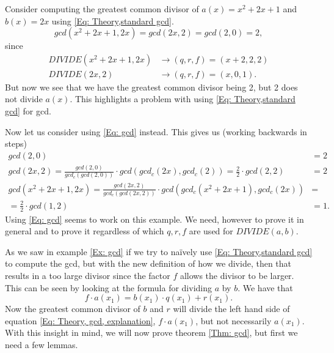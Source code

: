 \begin{example}\label{Ex: gcd}
  Consider computing the greatest common divisor of $a(x)=x^2+2x+1$ and $b(x)=2x$ using \ref{Eq: Theory,standard gcd}.
  \begin{equation}
    gcd(x^2+2x+1,2x)=gcd(2x,2)=gcd(2,0)=2,
  \end{equation}
  since
  \begin{equation}
    \begin{split}
      DIVIDE(x^2+2x+1,2x) & \rightarrow (q,r,f)=(x+2,2,2) \\
      DIVIDE(2x,2) & \rightarrow (q,r,f)=(x,0,1).
    \end{split}
  \end{equation}
  But now we see that we have the greatest common divisor being 2, but 2 does not divide $a(x)$. This highlights a problem with using \ref{Eq: Theory,standard gcd} for gcd.

  Now let us consider using \ref{Eq: gcd} instead. This gives us (working backwards in steps)
  \begin{equation}
    \begin{split}
      gcd(2,0) &= 2 \\
      gcd(2x,2) = \frac{gcd(2,0)}{gcd_c(gcd(2,0))}\cdot gcd(gcd_c(2x),gcd_c(2))= \frac{2}{2}\cdot gcd(2,2) &= 2 \\
      gcd(x^2+2x+1,2x) =\frac{gcd(2x,2)}{gcd_c(gcd(2x,2))}\cdot gcd(gcd_c(x^2+2x+1),gcd_c(2x)) & = \\ = \frac{2}{2}\cdot gcd(1,2) & = 1.
    \end{split}
  \end{equation}
  Using \ref{Eq: gcd} seems to work on this example. We need, however to prove it in general and to prove it regardless of which $q,r,f$ are used for $DIVIDE(a,b)$.
\end{example}
As we saw in example \ref{Ex: gcd} if we try to naïvely use \ref{Eq: Theory,standard gcd} to compute the gcd, but with the new definition of how we divide, then that results in a too large divisor since the factor $f$ allows the divisor to be larger. This can be seen by looking at the formula for dividing $a$ by $b$. We have that
\begin{equation}\label{Eq: Theory, gcd, explanation}
  f\cdot a(x_1)=b(x_1)\cdot q(x_1) + r(x_1).
\end{equation}
Now the greatest common divisor of $b$ and $r$ will divide the left hand side of equation \ref{Eq: Theory, gcd, explanation}, $f\cdot a(x_1)$, but not necessarily $a(x_1)$. With this insight in mind, we will now prove theorem \ref{Thm: gcd}, but first we need a few lemmas.
